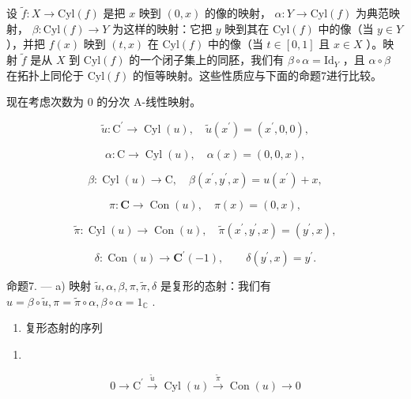 设 \(\tilde{f}: X \to \text{Cyl}(f)\) 是把 \(x\) 映到 \((0, x)\) 的像的映射， \(\alpha: Y \to \text{Cyl}(f)\) 为典范映射， \(\beta: \text{Cyl}(f) \to Y\) 为这样的映射：它把 \(y\) 映到其在 \(\text{Cyl}(f)\) 中的像（当 \(y \in Y\) ），并把 \(f(x)\) 映到 \((t, x)\) 在 \(\text{Cyl}(f)\) 中的像（当 \(t \in [0, 1]\) 且 \(x \in X\) ）。映射 \(\tilde{f}\) 是从 \(X\) 到 \(\text{Cyl}(f)\) 的一个闭子集上的同胚，我们有 \(\beta \circ \alpha = \text{Id}_Y\) ，且 \(\alpha \circ \beta\) 在拓扑上同伦于 \(\text{Cyl}(f)\) 的恒等映射。这些性质应与下面的命题7进行比较。

现在考虑次数为 0 的分次 A-线性映射。

\[
\tilde {u}: \mathrm{C} ^ {\prime} \rightarrow \operatorname{Cyl} (u), \quad \tilde {u} (x ^ {\prime}) = (x ^ {\prime}, 0, 0),
\]

\[
\alpha : \mathrm{C} \rightarrow \operatorname{Cyl} (u), \quad \alpha (x) = (0, 0, x),
\]

\[
\beta : \operatorname{Cyl} (u) \rightarrow \mathrm{C}, \quad \beta \left(x ^ {\prime}, y ^ {\prime}, x\right) = u \left(x ^ {\prime}\right) + x,
\]

\[
\pi : \mathbf {C} \rightarrow \operatorname{Con} (u), \quad \pi (x) = (0, x),
\]

\[
\tilde {\pi}: \operatorname{Cyl} (u) \to \operatorname{Con} (u), \quad \tilde {\pi} (x ^ {\prime}, y ^ {\prime}, x) = (y ^ {\prime}, x),
\]

\[
\delta : \operatorname{Con} (u) \to \mathbf {C} ^ {\prime} (- 1), \qquad \delta (y ^ {\prime}, x) = y ^ {\prime}.
\]

命题7. --- a) 映射 \(\tilde{u}, \alpha, \beta, \pi, \tilde{\pi}, \delta\) 是复形的态射：我们有 \(u = \beta \circ \tilde{u}, \pi = \tilde{\pi} \circ \alpha, \beta \circ \alpha = 1_{\mathbb{C}}\) .

\begin{enumerate}
\def\labelenumi{\alph{enumi})}
\setcounter{enumi}{1}
\tightlist
\item
  复形态射的序列
\end{enumerate}

\begin{enumerate}
\def\labelenumi{(\arabic{enumi})}
\setcounter{enumi}{5}
\tightlist
\item
\end{enumerate}

\[
0 \rightarrow \mathrm{C} ^ {\prime} \stackrel {\tilde {u}} {\rightarrow} \operatorname{Cyl} (u) \stackrel {\tilde {\pi}} {\rightarrow} \operatorname{Con} (u) \rightarrow 0\tag{7}
\]

